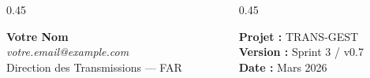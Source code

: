 \documentclass[
  aspectratio=169,       %
  xcolor=dvipsnames,     %
  t                      %
]{beamer}
\begin{document}
{\begin{frame}[plain]
\begin{center}
      \begin{columns}
        \begin{column}{0.45\textwidth}
          \begin{center}
            {\small\textbf{Votre Nom}\\
            \textit{votre.email@example.com}\\
            Direction des Transmissions — FAR}
          \end{center}
        \end{column}
        \begin{column}{0.45\textwidth}
          \begin{center}
            {\small\textbf{Projet :} TRANS-GEST\\
            \textbf{Version :} Sprint 3 / v0.7\\
            \textbf{Date :} Mars 2026}
          \end{center}
        \end{column}
      \end{columns}
    \end{center}
  \end{frame}
}

\end{document}
